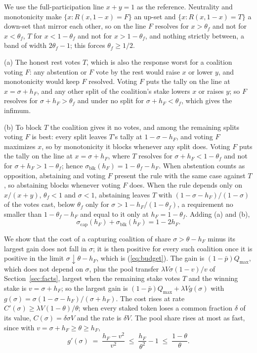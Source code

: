 \documentclass[conference,compsoc]{IEEEtran}
\newcommand{\hF}{h_{F}}
\newcommand{\sigcap}{\sigma_{\mathrm{cap}}}
\newcommand{\sigblk}{\sigma_{\mathrm{blk}}}
\begin{document}
\begin{IEEEproof}
We use the full-participation line $x + y = 1$ as the reference. Neutrality and monotonicity make $\{x : R(x, 1-x) = F\}$ an up-set and $\{x : R(x,1-x) = T\}$ a down-set that mirror each other, so on the line $F$ resolves for $x > \theta_f$ and not for $x < \theta_f$, $T$ for $x < 1 - \theta_f$ and not for $x > 1 - \theta_f$, and nothing strictly between, a band of width $2\theta_f - 1$; this forces $\theta_f \ge 1/2$.

 (a) The honest rest votes $T$, which is also the response worst for a coalition voting $F$: any abstention or $F$ vote by the rest would raise $x$ or lower $y$, and monotonicity would keep $F$ resolved. Voting $F$ puts the tally on the line at $x = \sigma + \hF$, and any other split of the coalition's stake lowers $x$ or raises $y$; so $F$ resolves for $\sigma + \hF > \theta_f$ and under no split for $\sigma + \hF < \theta_f$, which gives the infimum.

 (b) To block $T$ the coalition gives it no votes, and among the remaining splits voting $F$ is best: every split leaves $T$'s tally at $1 - \sigma - \hF$, and voting $F$ maximizes $x$, so by monotonicity it blocks whenever any split does. Voting $F$ puts the tally on the line at $x = \sigma + \hF$, where $T$ resolves for $\sigma + \hF < 1 - \theta_f$ and not for $\sigma + \hF > 1 - \theta_f$; hence $\sigblk(\hF) = 1 - \theta_f - \hF$. When abstention counts as opposition, abstaining and voting $F$ present the rule with the same case against $T$, so abstaining blocks whenever voting $F$ does. When the rule depends only on $x/(x+y)$, $\theta_f < 1$ and $\sigma < 1$, abstaining leaves $T$ with $(1 - \sigma - \hF)/(1 - \sigma)$ of the votes cast, below $\theta_f$ only for $\sigma > 1 - \hF/(1 - \theta_f)$, a requirement no smaller than $1 - \theta_f - \hF$ and equal to it only at $\hF = 1 - \theta_f$. Adding (a) and (b),
\[
\sigcap(\hF) + \sigblk(\hF) = 1 - 2\hF .
\]
\end{IEEEproof}

\begin{IEEEproof}
 We show that the cost of a capturing coalition of share $\sigma > \theta - \hF$ minus its largest gain does not fall in $\sigma$; it is then positive for every such coalition once it is positive in the limit $\sigma \downarrow \theta - \hF$, which is (\ref{eq:budget}). The gain is $(1 - \bar p)Q_{\max}$, which does not depend on $\sigma$, plus the pool transfer $\lambda V\sigma(1 - v)/v$ of Section~\ref{sec:facts}, largest when the remaining stake votes $T$ and the winning stake is $v = \sigma + \hF$; so the largest gain is $(1 - \bar p)Q_{\max} + \lambda V g(\sigma)$ with $g(\sigma) = \sigma(1 - \sigma - \hF)/(\sigma + \hF)$. The cost rises at rate $C'(\sigma) \ge \lambda V(1-\theta)/\theta$; when every staked token loses a common fraction $\delta$ of its value, $C(\sigma) = \delta \sigma V$ and the rate is $\delta V$. The pool share rises at most as fast, since with $v = \sigma + \hF \ge \theta \ge \hF$,
\[
g'(\sigma) \;=\; \frac{\hF - v^2}{v^2} \;\le\; \frac{\hF}{\theta^2} - 1 \;\le\; \frac{1 - \theta}{\theta} .
\]
\end{IEEEproof}
\end{document}
